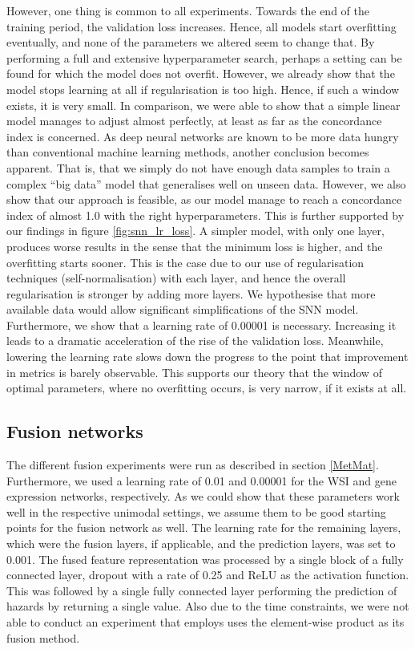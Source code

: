 However, one thing is common to all experiments. Towards the end of the training period, the validation loss increases. Hence, all models start overfitting eventually, and none of the parameters we altered seem to change that. By performing a full and extensive hyperparameter search, perhaps a setting can be found for which the model does not overfit. However, we already show that the model stops learning at all if regularisation is too high. Hence, if such a window exists, it is very small. In comparison, we were able to show that a simple linear model manages to adjust almost perfectly, at least as far as the concordance index is concerned. As deep neural networks are known to be more data hungry than conventional machine learning methods, another conclusion becomes apparent. That is, that we simply do not have enough data samples to train a complex “big data” model that generalises well on unseen data. 
However, we also show that our approach is feasible, as our model manage to reach a concordance index of almost 1.0 with the right hyperparameters. This is further supported by our findings in figure \ref{fig:snn_lr_loss}. A simpler model, with only one layer, produces worse results in the sense that the minimum loss is higher, and the overfitting starts sooner. This is the case due to our use of regularisation techniques (self-normalisation) with each layer, and hence the overall regularisation is stronger by adding more layers. We hypothesise that more available data would allow significant simplifications of the SNN model. Furthermore, we show that a learning rate of 0.00001 is necessary. Increasing it leads to a dramatic acceleration of the rise of the validation loss. Meanwhile, lowering the learning rate slows down the progress to the point that improvement in metrics is barely observable. This supports our theory that the window of optimal parameters, where no overfitting occurs, is very narrow, if it exists at all. 

\subsection{Fusion networks}

The different fusion experiments were run as described in section \ref{MetMat}. Furthermore, we used a learning rate of 0.01 and 0.00001 for the WSI and gene expression networks, respectively. As we could show that these parameters work well in the respective unimodal settings, we assume them to be good starting points for the fusion network as well. The learning rate for the remaining layers, which were the fusion layers, if applicable, and the prediction layers, was set to 0.001. The fused feature representation was processed by a single block of a fully connected layer, dropout with a rate of 0.25 and ReLU as the activation function. This was followed by a single fully connected layer performing the prediction of hazards by returning a single value.
Also due to the time constraints, we were not able to conduct an experiment that employs uses the element-wise product as its fusion method.

